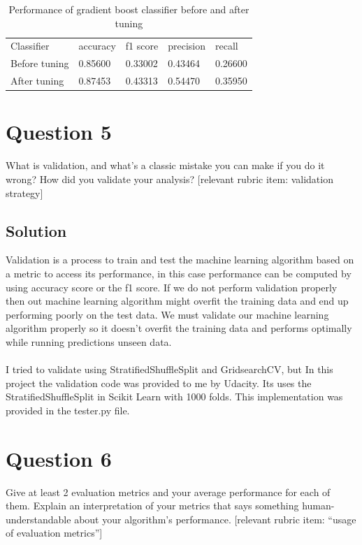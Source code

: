 \documentclass[12pt]{article}%
\begin{document}
\begin{table}[!htb]
\centering
\caption{Performance of gradient boost classifier before and after tuning }
\begin{tabular}{lllll}
 Classifier & accuracy & f1 score & precision & recall \\
 Before tuning & 0.85600 & 0.33002 & 0.43464 & 0.26600 \\
 After tuning & 0.87453 &  0.43313 & 0.54470 & 0.35950 \\ 
 
\end{tabular}
\end{table}


\section*{Question 5}
What is validation, and what’s a classic mistake you can make if you do it wrong? How did you validate your analysis?  [relevant rubric item: validation strategy]


\subsection*{Solution}

Validation is a process to train and test the machine learning algorithm based on a metric to access its performance, in this case performance can be computed by using accuracy score or the f1 score. If we do not perform validation properly then out machine learning algorithm might overfit the training data and end up performing poorly on the test data. We must validate our machine learning algorithm properly so it doesn't overfit the training data and performs optimally while running predictions unseen data.
\\
\\
I tried to validate using StratifiedShuffleSplit and GridsearchCV, but In this project the validation code was provided to me by Udacity. Its uses the StratifiedShuffleSplit in Scikit Learn with 1000 folds. This implementation was provided in the tester.py file.


\section*{Question 6}
Give at least 2 evaluation metrics and your average performance for each of them.  Explain an interpretation of your metrics that says something human-understandable about your algorithm’s performance. [relevant rubric item: “usage of evaluation metrics”]
\end{document}
